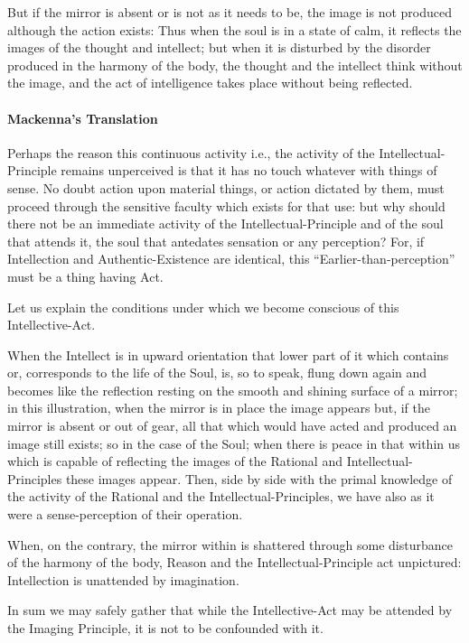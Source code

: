 \begin{quotex}
But if the mirror is absent or is not as it needs to be, the image is not produced although the action exists: Thus when the soul is in a state of calm, it reflects the images of the thought and intellect; but when it is disturbed by the disorder produced in the harmony of the body, the thought and the intellect think without the image, and the act of intelligence takes place without being reflected.
\end{quotex}


\paragraph{Mackenna's Translation}


\begin{quotex}
Perhaps the reason this continuous activity i.e., the activity of the Intellectual-Principle remains unperceived is that it has no touch whatever with things of sense. No doubt action upon material things, or action dictated by them, must proceed through the sensitive faculty which exists for that use: but why should there not be an immediate activity of the Intellectual-Principle and of the soul that attends it, the soul that antedates sensation or any perception? For, if Intellection and Authentic-Existence are identical, this ``Earlier-than-perception'' must be a thing having Act.

Let us explain the conditions under which we become conscious of this Intellective-Act.

When the Intellect is in upward orientation that lower part of it which contains or, corresponds to the life of the Soul, is, so to speak, flung down again and becomes like the reflection resting on the smooth and shining surface of a mirror; in this illustration, when the mirror is in place the image appears but, if the mirror is absent or out of gear, all that which would have acted and produced an image still exists; so in the case of the Soul; when there is peace in that within us which is capable of reflecting the images of the Rational and Intellectual-Principles these images appear. Then, side by side with the primal knowledge of the activity of the Rational and the Intellectual-Principles, we have also as it were a sense-perception of their operation.

When, on the contrary, the mirror within is shattered through some disturbance of the harmony of the body, Reason and the Intellectual-Principle act unpictured: Intellection is unattended by imagination.

In sum we may safely gather that while the Intellective-Act may be attended by the Imaging Principle, it is not to be confounded with it.
\end{quotex}


